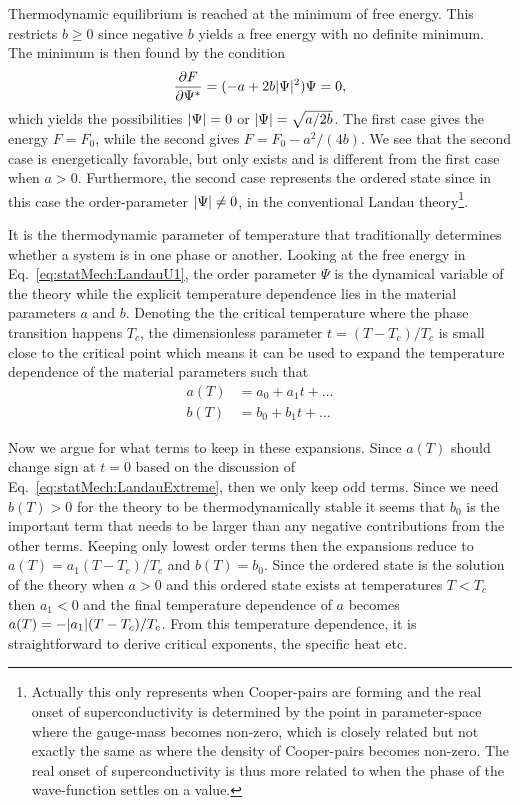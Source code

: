 Thermodynamic equilibrium is reached at the minimum of free energy. This restricts $b\geq0$ since negative $b$ yields
a free energy with no definite minimum. The minimum is then found by the condition
\begin{equation}
    \label{eq:statMech:LandauExtreme}
    \frac{\partial F}{\partial \Psi^\ast} = (-a + 2b\lvert \Psi \rvert^2)\Psi = 0,
\end{equation}
which yields the possibilities $\lvert \Psi \rvert = 0$ or $\lvert \Psi \rvert = \sqrt{a/2b}$. The first case gives the energy $F = F_0$, while the second
gives $F = F_0 - a^2/(4b)$. We see that the second case is energetically favorable, but only exists and is different from
the first case when $a>0$. Furthermore, the second case represents the ordered state since in this case the order-parameter $\lvert \Psi \rvert \neq 0$,
in the conventional Landau theory\footnote{Actually this only represents when Cooper-pairs are forming and the real onset
of superconductivity is determined by the point in parameter-space where the gauge-mass becomes non-zero, which is closely
related but not exactly the same as where the density of Cooper-pairs becomes non-zero. The real onset of superconductivity is
thus more related to when the phase of the wave-function settles on a value.}.

It is the thermodynamic parameter of temperature that traditionally determines whether a system is in one phase or another.
Looking at the free energy in Eq.~\eqref{eq:statMech:LandauU1}, the order parameter $\Psi$ is the dynamical variable 
of the theory while the explicit temperature dependence lies in the material parameters $a$ and $b$. Denoting the
the critical temperature where the phase transition happens $T_c$, the dimensionless parameter
$t = (T-T_c)/T_c$ is small close to the critical point which means it can be used to expand the temperature dependence
of the material parameters such that
\begin{equation}
    \label{eq:statMech:matTempExpan}
    \begin{split}
        a(T) &= a_0 + a_1t + \ldots\\
        b(T) &= b_0 + b_1t + \ldots
    \end{split}
\end{equation}

Now we argue for what terms to keep in these expansions. Since $a(T)$ should change sign at $t=0$ based on the discussion of
Eq.~\eqref{eq:statMech:LandauExtreme}, then we only keep odd terms.
Since we need $b(T)>0$ for the theory to be thermodynamically stable it seems that $b_0$ is the important term that needs to be
larger than any negative contributions from the other terms. Keeping only lowest order terms then the expansions reduce to
$a(T) = a_1(T-T_c)/T_c$ and $b(T) = b_0$. Since the ordered state is the solution of the theory when $a>0$ and this ordered
state exists at temperatures $T<T_c$ then $a_1<0$ and the final temperature dependence of $a$ becomes
$a(T) = -\lvert a_1 \rvert(T-T_c)/T_c$. From this temperature dependence, it is straightforward to derive critical exponents, the specific
heat etc.

